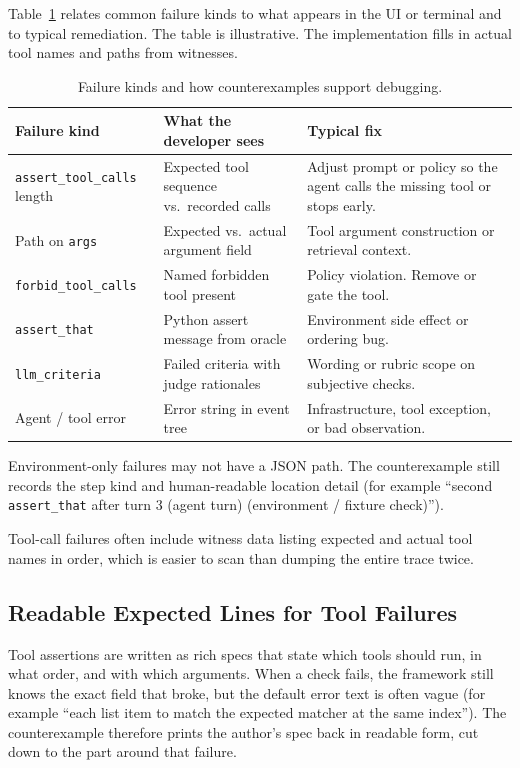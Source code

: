 Table~\ref{tab:failure-hints} relates common failure kinds to what appears in the UI or terminal and to typical remediation. The table is illustrative. The implementation fills in actual tool names and paths from witnesses.

\begin{table}[htbp]
\centering
\small
\begin{tabularx}{\textwidth}{p{}p{}X}
\toprule
\textbf{Failure kind} & \textbf{What the developer sees} & \textbf{Typical fix} \\
\midrule
\texttt{assert\_tool\_calls} length &
Expected tool sequence vs.\ recorded calls &
Adjust prompt or policy so the agent calls the missing tool or stops early. \\
Path on \texttt{args} &
Expected vs.\ actual argument field &
Tool argument construction or retrieval context. \\
\texttt{forbid\_tool\_calls} &
Named forbidden tool present &
Policy violation. Remove or gate the tool. \\
\texttt{assert\_that} &
Python assert message from oracle &
Environment side effect or ordering bug. \\
\texttt{llm\_criteria} &
Failed criteria with judge rationales &
Wording or rubric scope on subjective checks. \\
Agent / tool error &
Error string in event tree &
Infrastructure, tool exception, or bad observation. \\
\bottomrule
\end{tabularx}
\caption{Failure kinds and how counterexamples support debugging.}
\label{tab:failure-hints}
\end{table}

Environment-only failures may not have a JSON path. The counterexample still records the step kind and human-readable location detail (for example ``second \texttt{assert\_that} after turn 3 (agent turn) (environment / fixture check)'').

Tool-call failures often include witness data listing expected and actual tool names in order, which is easier to scan than dumping the entire trace twice.

\subsection{Readable Expected Lines for Tool Failures}
\label{sec:matcher-spec-repr}

Tool assertions are written as rich specs that state which tools should run, in what order, and with which arguments. When a check fails, the framework still knows the exact field that broke, but the default error text is often vague (for example ``each list item to match the expected matcher at the same index''). The counterexample therefore prints the author's spec back in readable form, cut down to the part around that failure.

